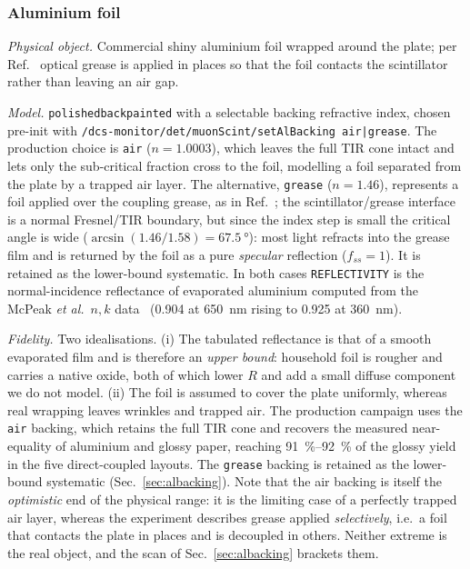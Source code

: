 \documentclass[11pt,a4paper]{article}
\begin{document}
\subsubsection{Aluminium foil}
\label{sec:refl-al}

\emph{Physical object.} Commercial shiny aluminium foil wrapped around the
plate; per Ref.~\cite{Rao2025} optical grease is applied in places so that the
foil contacts the scintillator rather than leaving an air gap.

\emph{Model.} \texttt{polishedbackpainted} with a selectable backing refractive
index, chosen pre-init with
\texttt{/dcs-monitor/det/muonScint/setAlBacking air|grease}. The production
choice is \texttt{air} ($n=1.0003$), which leaves the full TIR cone intact and
lets only the sub-critical fraction cross to the foil, modelling a foil
separated from the plate by a trapped air layer. The alternative,
\texttt{grease} ($n=1.46$), represents a foil applied over the coupling grease,
as in Ref.~\cite{Rao2025}; the scintillator/grease interface is a normal
Fresnel/TIR boundary, but since the index step is small the critical angle is
wide ($\arcsin(1.46/1.58)=\SI{67.5}{\degree}$): most light refracts into the
grease film and is returned by the foil as a pure \emph{specular} reflection
($f_{ss}=1$). It is retained as the lower-bound systematic. In both cases
\texttt{REFLECTIVITY} is the normal-incidence reflectance of evaporated
aluminium computed from the McPeak \emph{et al.}~$n,k$
data~\cite{McPeak2015} (\num{0.904} at \SI{650}{\nano\meter} rising to
\num{0.925} at \SI{360}{\nano\meter}).

\emph{Fidelity.} Two idealisations. (i) The tabulated reflectance is that of a
smooth evaporated film and is therefore an \emph{upper bound}: household foil is
rougher and carries a native oxide, both of which lower $R$ and add a small
diffuse component we do not model. (ii) The foil is assumed to cover the plate
uniformly, whereas real wrapping leaves wrinkles and trapped air. The production
campaign uses the \texttt{air} backing, which retains the full TIR cone and
recovers the measured near-equality of aluminium and glossy paper, reaching
\SIrange{91}{92}{\percent} of the glossy yield in the five direct-coupled
layouts.
The \texttt{grease} backing is retained as the lower-bound systematic
(Sec.~\ref{sec:albacking}). Note that the air backing is itself the
\emph{optimistic} end of the physical range: it is the limiting case of a
perfectly trapped air layer, whereas the experiment describes grease applied
\emph{selectively}, i.e.\ a foil that contacts the plate in places and is
decoupled in others. Neither extreme is the real object, and the scan of
Sec.~\ref{sec:albacking} brackets them.
\end{document}
